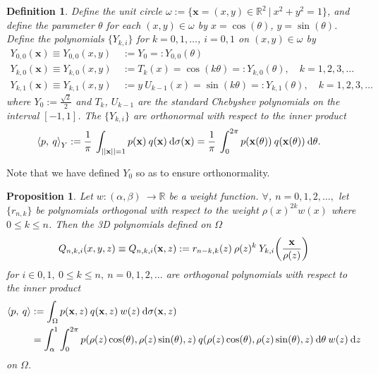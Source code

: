 \documentclass[11pt, oneside]{article}   	%
\newcommand{\R}{\mathbb{R}}
\newcommand{\scop}{Q}
\newcommand{\scopnki}{\scop_{n,k,i}}
\newcommand{\xvec}{\mathbf{x}}
\newcommand{\ch}{Y}
\newcommand{\chki}{\ch_{k,i}}
\newtheorem{proposition}{Proposition}
\newtheorem{definition}{Definition}
\begin{document}
\begin{definition}
Define the unit circle $\omega := \{ \mathbf{x} = (x,y) \in \R^2 \: | \: x^2 + y^2 = 1\}$, and define the parameter $\theta$ for each $(x,y) \in \omega$ by $x = \cos(\theta)$, $y = \sin(\theta)$. Define the polynomials $\{\chki\}$ for $k = 0, 1, \dots$, $i = 0, 1$ on $(x,y) \in \omega$ by
\begin{align}
	\ch_{0,0}(\xvec) \equiv \ch_{0,0}(x, y) &:= \ch_{0} =: \ch_{0,0}(\theta) \nonumber \\
	\ch_{k,0}(\xvec) \equiv \ch_{k,0}(x, y) \ &:= T_k(x) = \cos(k \theta) =: \ch_{k,0}(\theta), \quad k = 1,2,3,\dots\label{eqn:chebyshev} \\
	\ch_{k,1}(\xvec) \equiv \ch_{k,1}(x, y) &:= y \: U_{k-1}(x) = \sin(k \theta) =: \ch_{k,1}(\theta), \quad k = 1,2,3,\dots \nonumber
\end{align}
where $\ch_{0} := \frac{\sqrt{2}}{2}$ and $T_k$, $U_{k-1}$ are the standard Chebyshev polynomials on the interval $[-1,1]$. The $\{Y_{k,i}\}$ are orthonormal with respect to the inner product
\begin{align}
	\ip< p, \: q >_{\ch} &:= \frac{1}{\pi} \: \int_{||\xvec|| = 1} p(\xvec) \: q(\xvec) \: \D \sigma(\xvec) = \frac{1}{\pi} \: \int_0^{2\pi} p(\xvec(\theta)) \: q(\xvec(\theta)) \: \D \theta. \label{eqn:ipcircularharmonics}
\end{align}
\end{definition}
Note that we have defined $\ch_0$ so as to ensure orthonormality. 

\begin{proposition}\label{prop:construction}
Let $w : (\alpha,\beta) \: \to \R$ be a weight function. $\forall$, $n = 0,1,2,\dots, $ let $\{r_{n,k}\}$ be polynomials orthogonal with respect to the weight $\rho(x)^{2k} w(x)$ where $0 \le k \le n$. Then the 3D polynomials defined on $\Omega$
\begin{align*}
	\scopnki(x,y,z) \equiv \scopnki(\xvec,z) := r_{n-k,k}(z) \: \rho(z)^k \: \ch_{k,i}\fpr(\frac{\xvec}{\rho(z)})
\end{align*}
for $i \in {0,1}, \: 0 \le k \le n, \: n = 0,1,2,\dots$ are orthogonal polynomials with respect to the inner product
\begin{align*}
	\ip< p, \: q > &:= \int_\Omega p(\xvec, z) \: q(\xvec, z) \: w(z) \: \D \sigma(\xvec, z) \\
	&= \int_\alpha^1 \int_0^{2\pi} p(\rho(z) \cos(\theta), \rho(z) \sin(\theta), z) \: q(\rho(z) \cos(\theta), \rho(z) \sin(\theta), z) \: \D \theta \: w(z) \: \D z
\end{align*}
on $\Omega$. 
\end{proposition}
\end{document}

